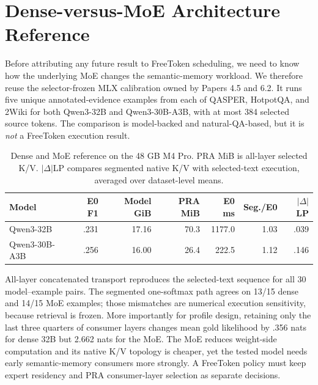 \documentclass[10pt]{article}
\begin{document}
\section{Dense-versus-MoE Architecture Reference}
Before attributing any future result to FreeToken scheduling, we need to know
how the underlying MoE changes the semantic-memory workload. We therefore reuse
the selector-frozen MLX calibration owned by Papers 4.5 and 6.2. It runs five
unique annotated-evidence examples from each of QASPER, HotpotQA, and 2Wiki for
both Qwen3-32B and Qwen3-30B-A3B, with at most 384 selected source tokens. The
comparison is model-backed and natural-QA-based, but it is \emph{not} a
FreeToken execution result.

\begin{table}[t]
\centering\small
\caption{Dense and MoE reference on the 48 GB M4 Pro. PRA MiB is all-layer
selected K/V. $|\Delta|$LP compares segmented native K/V with selected-text
execution, averaged over dataset-level means.}
\begin{tabular}{lrrrrrr}
\toprule Model & E0 F1 & Model GiB & PRA MiB & E0 ms & Seg./E0 & $|\Delta|$LP\\
\midrule
Qwen3-32B & .231 & 17.16 & 70.3 & 1177.0 & 1.03 & .039\\
Qwen3-30B-A3B & .256 & 16.00 & 26.4 & 222.5 & 1.12 & .146\\
\bottomrule
\end{tabular}
\label{tab:moe-reference}
\end{table}

All-layer concatenated transport reproduces the selected-text sequence for all
30 model--example pairs. The segmented one-softmax path agrees on 13/15 dense
and 14/15 MoE examples; those mismatches are numerical execution sensitivity,
because retrieval is frozen. More importantly for profile design, retaining
only the last three quarters of consumer layers changes mean gold likelihood by
.356 nats for dense 32B but 2.662 nats for the MoE. The MoE reduces weight-side
computation and its native K/V topology is cheaper, yet the tested model needs
early semantic-memory consumers more strongly. A FreeToken policy must keep
expert residency and PRA consumer-layer selection as separate decisions.
\end{document}
